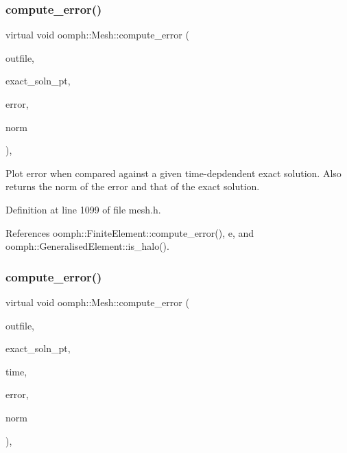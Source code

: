 \subsubsection{\texorpdfstring{compute\+\_\+error()}{compute\_error()}\hspace{0.1cm}{\footnotesize\ttfamily [2/4]}}
{\footnotesize\ttfamily virtual void oomph\+::\+Mesh\+::compute\+\_\+error (\begin{DoxyParamCaption}\item[{std\+::ostream \&}]{outfile,  }\item[{\hyperlink{classoomph_1_1FiniteElement_a690fd33af26cc3e84f39bba6d5a85202}{Finite\+Element\+::\+Steady\+Exact\+Solution\+Fct\+Pt}}]{exact\+\_\+soln\+\_\+pt,  }\item[{double \&}]{error,  }\item[{double \&}]{norm }\end{DoxyParamCaption})\hspace{0.3cm}{\ttfamily [inline]}, {\ttfamily [virtual]}}



Plot error when compared against a given time-\/depdendent exact solution. Also returns the norm of the error and that of the exact solution. 



Definition at line 1099 of file mesh.\+h.



References oomph\+::\+Finite\+Element\+::compute\+\_\+error(), e, and oomph\+::\+Generalised\+Element\+::is\+\_\+halo().

\mbox{\label{classoomph_1_1Mesh_a13e54320a2c859f9085a8ecd01cc72f0}} 
\subsubsection{\texorpdfstring{compute\+\_\+error()}{compute\_error()}\hspace{0.1cm}{\footnotesize\ttfamily [3/4]}}
{\footnotesize\ttfamily virtual void oomph\+::\+Mesh\+::compute\+\_\+error (\begin{DoxyParamCaption}\item[{std\+::ostream \&}]{outfile,  }\item[{\hyperlink{classoomph_1_1FiniteElement_ad4ecf2b61b158a4b4d351a60d23c633e}{Finite\+Element\+::\+Unsteady\+Exact\+Solution\+Fct\+Pt}}]{exact\+\_\+soln\+\_\+pt,  }\item[{const double \&}]{time,  }\item[{\hyperlink{classoomph_1_1Vector}{Vector}$<$ double $>$ \&}]{error,  }\item[{\hyperlink{classoomph_1_1Vector}{Vector}$<$ double $>$ \&}]{norm }\end{DoxyParamCaption})\hspace{0.3cm}{\ttfamily [inline]}, {\ttfamily [virtual]}}



